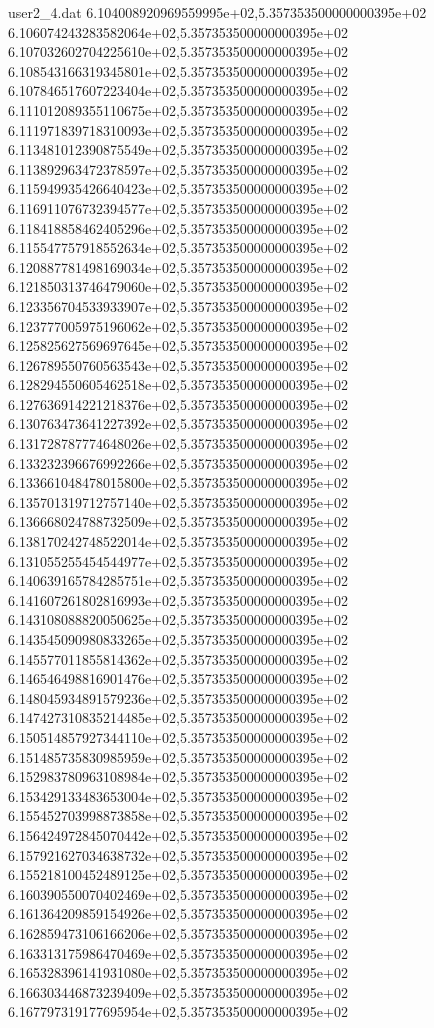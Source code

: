 \begin{filecontents}{user2_4.dat}
6.104008920969559995e+02,5.357353500000000395e+02
6.106074243283582064e+02,5.357353500000000395e+02
6.107032602704225610e+02,5.357353500000000395e+02
6.108543166319345801e+02,5.357353500000000395e+02
6.107846517607223404e+02,5.357353500000000395e+02
6.111012089355110675e+02,5.357353500000000395e+02
6.111971839718310093e+02,5.357353500000000395e+02
6.113481012390875549e+02,5.357353500000000395e+02
6.113892963472378597e+02,5.357353500000000395e+02
6.115949935426640423e+02,5.357353500000000395e+02
6.116911076732394577e+02,5.357353500000000395e+02
6.118418858462405296e+02,5.357353500000000395e+02
6.115547757918552634e+02,5.357353500000000395e+02
6.120887781498169034e+02,5.357353500000000395e+02
6.121850313746479060e+02,5.357353500000000395e+02
6.123356704533933907e+02,5.357353500000000395e+02
6.123777005975196062e+02,5.357353500000000395e+02
6.125825627569697645e+02,5.357353500000000395e+02
6.126789550760563543e+02,5.357353500000000395e+02
6.128294550605462518e+02,5.357353500000000395e+02
6.127636914221218376e+02,5.357353500000000395e+02
6.130763473641227392e+02,5.357353500000000395e+02
6.131728787774648026e+02,5.357353500000000395e+02
6.133232396676992266e+02,5.357353500000000395e+02
6.133661048478015800e+02,5.357353500000000395e+02
6.135701319712757140e+02,5.357353500000000395e+02
6.136668024788732509e+02,5.357353500000000395e+02
6.138170242748522014e+02,5.357353500000000395e+02
6.131055255454544977e+02,5.357353500000000395e+02
6.140639165784285751e+02,5.357353500000000395e+02
6.141607261802816993e+02,5.357353500000000395e+02
6.143108088820050625e+02,5.357353500000000395e+02
6.143545090980833265e+02,5.357353500000000395e+02
6.145577011855814362e+02,5.357353500000000395e+02
6.146546498816901476e+02,5.357353500000000395e+02
6.148045934891579236e+02,5.357353500000000395e+02
6.147427310835214485e+02,5.357353500000000395e+02
6.150514857927344110e+02,5.357353500000000395e+02
6.151485735830985959e+02,5.357353500000000395e+02
6.152983780963108984e+02,5.357353500000000395e+02
6.153429133483653004e+02,5.357353500000000395e+02
6.155452703998873858e+02,5.357353500000000395e+02
6.156424972845070442e+02,5.357353500000000395e+02
6.157921627034638732e+02,5.357353500000000395e+02
6.155218100452489125e+02,5.357353500000000395e+02
6.160390550070402469e+02,5.357353500000000395e+02
6.161364209859154926e+02,5.357353500000000395e+02
6.162859473106166206e+02,5.357353500000000395e+02
6.163313175986470469e+02,5.357353500000000395e+02
6.165328396141931080e+02,5.357353500000000395e+02
6.166303446873239409e+02,5.357353500000000395e+02
6.167797319177695954e+02,5.357353500000000395e+02

\end{filecontents}
